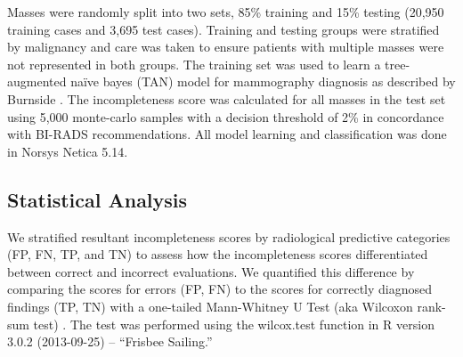 Masses were randomly split into two sets, 85\% training and 15\% testing (20,950 training cases and 3,695 test cases). Training and testing groups were stratified by malignancy and care was taken to ensure patients with multiple masses were not represented in both groups. The training set was used to learn a tree-augmented na\"{i}ve bayes (TAN) model for mammography diagnosis as described by Burnside \cite{Burnside:2009br, Friedman:1997gw}. The incompleteness score was calculated for all masses in the test set using 5,000 monte-carlo samples with a decision threshold of 2\% in concordance with BI-RADS recommendations. All model learning and classification was done in Norsys Netica 5.14.

\subsection{Statistical Analysis}
We stratified resultant incompleteness scores by radiological predictive categories (FP, FN, TP, and TN) to assess how the incompleteness scores differentiated between correct and incorrect evaluations. We quantified this difference by comparing the scores for errors (FP, FN) to the scores for correctly diagnosed findings (TP, TN) with a one-tailed Mann-Whitney U Test (aka Wilcoxon rank-sum test) \cite{Wilcoxon:1945tm}. The test was performed using the wilcox.test function in R version 3.0.2 (2013-09-25) -- ``Frisbee Sailing.''
